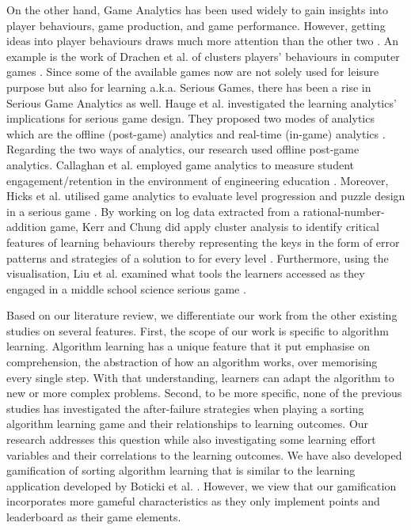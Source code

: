\documentclass[conference]{IEEEtran}
\begin{document}
On the other hand, Game Analytics has been used widely to gain insights into player behaviours, game production, and game performance. However, getting ideas into player behaviours draws much more attention than the other two \cite{bauckhage2015age}. An example is the work of Drachen et al. of clusters players’ behaviours in computer games \cite{drachen2012guns}. Since some of the available games now are not solely used for leisure purpose but also for learning a.k.a. Serious Games, there has been a rise in Serious Game Analytics as well. Hauge et al. investigated the learning analytics’ implications for serious game design. They proposed two modes of analytics which are the offline (post-game) analytics and real-time (in-game) analytics \cite{hauge2014analytics}. Regarding the two ways of analytics, our research used offline post-game analytics. Callaghan et al. employed game analytics to measure student engagement/retention in the environment of engineering education \cite{callaghan2014analytics}. Moreover, Hicks et al. utilised game analytics to evaluate level progression and puzzle design in a serious game \cite{hicks2016analytics}. By working on log data extracted from a rational-number-addition game, Kerr and Chung did apply cluster analysis to identify critical features of learning behaviours thereby representing the keys in the form of error patterns and strategies of a solution to for every level \cite{kerr2012identifying}. Furthermore, using the visualisation, Liu et al. examined what tools the learners accessed as they engaged in a middle school science serious game \cite{Liu2015}.

Based on our literature review, we differentiate our work from the other existing studies on several features. First, the scope of our work is specific to algorithm learning. Algorithm learning has a unique feature that it put emphasise on comprehension, the abstraction of how an algorithm works, over memorising every single step. With that understanding, learners can adapt the algorithm to new or more complex problems. Second, to be more specific, none of the previous studies has investigated the after-failure strategies when playing a sorting algorithm learning game and their relationships to learning outcomes. Our research addresses this question while also investigating some learning effort variables and their correlations to the learning outcomes. We have also developed gamification of sorting algorithm learning that is similar to the learning application developed by Boticki et al. \cite{boticki2013sorting}. However, we view that our gamification incorporates more gameful characteristics as they only implement points and leaderboard as their game elements.
\end{document}
